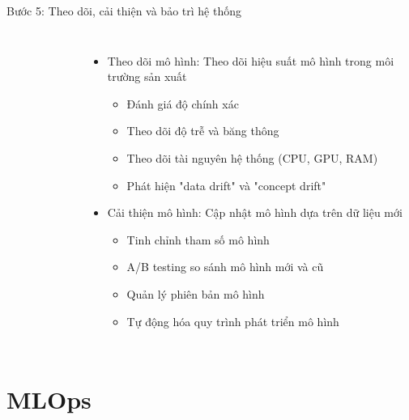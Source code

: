 \documentclass{beamer}
\begin{document}
\begin{frame}{Bước 5: Theo dõi, cải thiện và bảo trì hệ thống}
    \begin{columns}
        \begin{figure}
            \centering
        \end{figure}
        \begin{itemize}
            \item Theo dõi mô hình: Theo dõi hiệu suất mô hình trong môi trường sản xuất
            \begin{itemize}
                \item Đánh giá độ chính xác
                \item Theo dõi độ trễ và băng thông
                \item Theo dõi tài nguyên hệ thống (CPU, GPU, RAM)
                \item Phát hiện "data drift" và "concept drift"
            \end{itemize}
            \item Cải thiện mô hình: Cập nhật mô hình dựa trên dữ liệu mới
            \begin{itemize}
                \item Tinh chỉnh tham số mô hình
                \item A/B testing so sánh mô hình mới và cũ
                \item Quản lý phiên bản mô hình
                \item Tự động hóa quy trình phát triển mô hình
            \end{itemize}
        \end{itemize}
    \end{columns}
\end{frame}

\section{MLOps}
\end{document}
